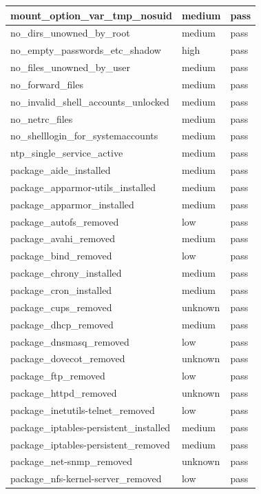 \begin{longtable}{|p{10cm}|p{2cm}|p{2cm}|}
\hline
mount\_option\_var\_tmp\_nosuid & medium & pass \\
\hline
no\_dirs\_unowned\_by\_root & medium & pass \\
\hline
no\_empty\_passwords\_etc\_shadow & high & pass \\
\hline
no\_files\_unowned\_by\_user & medium & pass \\
\hline
no\_forward\_files & medium & pass \\
\hline
no\_invalid\_shell\_accounts\_unlocked & medium & pass \\
\hline
no\_netrc\_files & medium & pass \\
\hline
no\_shelllogin\_for\_systemaccounts & medium & pass \\
\hline
ntp\_single\_service\_active & medium & pass \\
\hline
package\_aide\_installed & medium & pass \\
\hline
package\_apparmor-utils\_installed & medium & pass \\
\hline
package\_apparmor\_installed & medium & pass \\
\hline
package\_autofs\_removed & low & pass \\
\hline
package\_avahi\_removed & medium & pass \\
\hline
package\_bind\_removed & low & pass \\
\hline
package\_chrony\_installed & medium & pass \\
\hline
package\_cron\_installed & medium & pass \\
\hline
package\_cups\_removed & unknown & pass \\
\hline
package\_dhcp\_removed & medium & pass \\
\hline
package\_dnsmasq\_removed & low & pass \\
\hline
package\_dovecot\_removed & unknown & pass \\
\hline
package\_ftp\_removed & low & pass \\
\hline
package\_httpd\_removed & unknown & pass \\
\hline
package\_inetutils-telnet\_removed & low & pass \\
\hline
package\_iptables-persistent\_installed & medium & pass \\
\hline
package\_iptables-persistent\_removed & medium & pass \\
\hline
package\_net-snmp\_removed & unknown & pass \\
\hline
package\_nfs-kernel-server\_removed & low & pass \\

\end{longtable}
